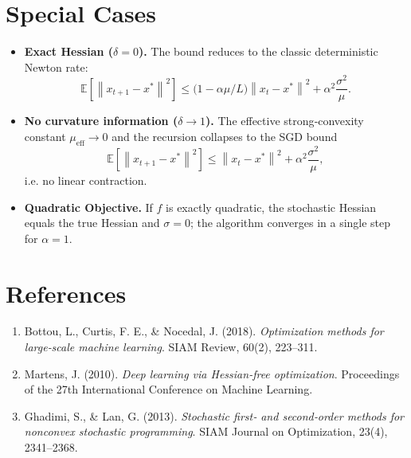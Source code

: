 \documentclass[11pt]{article}
\newcommand{\E}{\mathbb{E}}
\newcommand{\norm}[1]{\left\|#1\right\|}
\begin{document}
\section*{Special Cases}
\begin{itemize}
\item \textbf{Exact Hessian ($\delta=0$).}  
The bound reduces to the classic deterministic Newton rate:
\[
\E\!\left[\norm{x_{t+1}-x^{*}}^{2}\right]\le\big(1-\alpha\mu/L\big)\norm{x_{t}-x^{*}}^{2}
+\alpha^{2}\frac{\sigma^{2}}{\mu}.
\]
\item \textbf{No curvature information ($\delta\to1$).}  
The effective strong‑convexity constant $\mu_{\mathrm{eff}}\to0$ and the recursion collapses to the SGD bound
\[
\E\!\left[\norm{x_{t+1}-x^{*}}^{2}\right]\le
\norm{x_{t}-x^{*}}^{2}+ \alpha^{2}\frac{\sigma^{2}}{\mu},
\]
i.e. no linear contraction.
\item \textbf{Quadratic Objective.}  
If $f$ is exactly quadratic, the stochastic Hessian equals the true Hessian and $\sigma=0$; the algorithm converges in a single step for $\alpha=1$.
\end{itemize}

\section*{References}
\begin{enumerate}
\item Bottou, L., Curtis, F. E., \& Nocedal, J. (2018). \emph{Optimization methods for large‑scale machine learning}. SIAM Review, 60(2), 223–311.
\item Martens, J. (2010). \emph{Deep learning via Hessian‑free optimization}. Proceedings of the 27th International Conference on Machine Learning.
\item Ghadimi, S., \& Lan, G. (2013). \emph{Stochastic first‑ and second‑order methods for nonconvex stochastic programming}. SIAM Journal on Optimization, 23(4), 2341–2368.
\end{enumerate}
\end{document}
